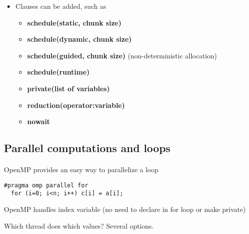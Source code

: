 \documentclass[%
oneside,                 %
final,                   %
10pt]{article}
\begin{document}
\begin{itemize}
\item Clauses can be added, such as
\begin{itemize}

  \item \textbf{schedule(static, chunk size)}

  \item \textbf{schedule(dynamic, chunk size)} 

  \item \textbf{schedule(guided, chunk size)} (non-deterministic allocation)

  \item \textbf{schedule(runtime)}

  \item \textbf{private(list of variables)}

  \item \textbf{reduction(operator:variable)}

  \item \textbf{nowait}
\end{itemize}

\noindent
\end{itemize}

\noindent



\subsection*{Parallel computations and loops}


\paragraph{}
OpenMP provides an easy way to parallelize a loop



\begin{verbatim}
#pragma omp parallel for
  for (i=0; i<n; i++) c[i] = a[i];

\end{verbatim}

OpenMP handles index variable (no need to declare in for loop or make private)

Which thread does which values?  Several options.
\end{document}
